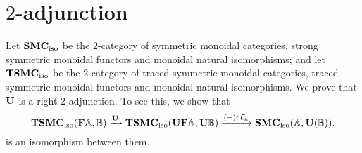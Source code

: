 
\section{\(2\)-adjunction}
\label{2-adjunction}

Let \(\mathbf{SMC}_{\mathrm{iso}}\) be the \(2\)-category of symmetric monoidal categories,
strong symmetric monoidal functors and monoidal natural isomorphisms;
and let \(\mathbf{TSMC}_{\mathrm{iso}}\) be the \(2\)-category of traced symmetric
monoidal categories, traced symmetric monoidal functors and monoidal
natural isomorphisms. We prove that \(\mathbf{U}\) is a right \(2\)-adjunction.
To see this, we show that
\begin{equation*}
  \mathbf{TSMC}_{\mathrm{iso}}(\mathbf{F}\mathbb{A},\mathbb{B}) \xrightarrow{\mathbf{U}}
  \mathbf{TSMC}_{\mathrm{iso}}(\mathbf{U}\mathbf{F}\mathbb{A},\mathbf{U}\mathbb{B}) \xrightarrow{(-) \circ \textit{\textsf{E}}_{\mathbb{A}}}
  \mathbf{SMC}_{\mathrm{iso}}(\mathbb{A},\mathbf{U}(\mathbb{\mathbb{B}})).
\end{equation*}
is an isomorphism between them.

